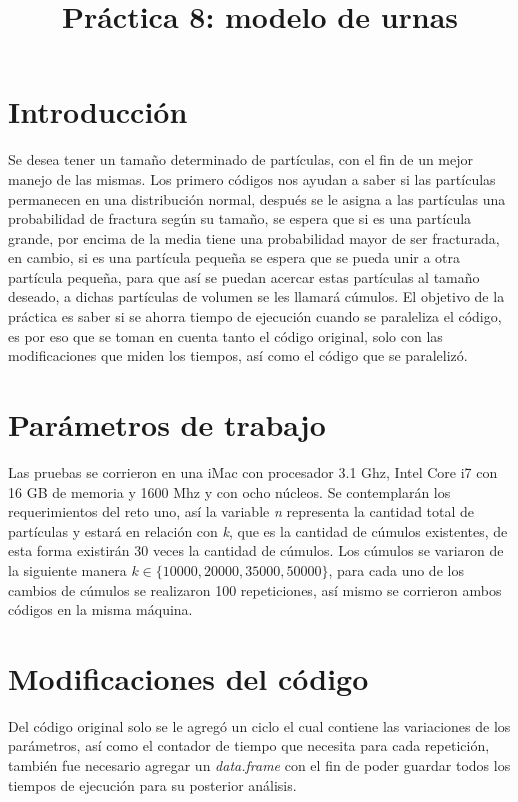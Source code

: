 \documentclass[a4paper]{article}
\title{Práctica 8: modelo de urnas}
\begin{document}
\maketitle

\section{Introducci\'on}
Se desea tener un tamaño determinado de partículas, con el fin de un mejor manejo de las mismas. Los primero códigos nos ayudan a saber si las partículas permanecen en una distribución normal, después se le asigna a las partículas una probabilidad de fractura según su tamaño, se espera que si es una partícula grande, por encima de la media tiene una probabilidad mayor de ser fracturada, en cambio, si es una partícula pequeña se espera que se pueda unir a otra partícula pequeña, para que así se puedan acercar estas partículas al tamaño deseado, a dichas partículas de volumen se les llamará cúmulos. El objetivo de la práctica es saber si se ahorra tiempo de ejecución cuando se paraleliza el código, es por eso que se toman en cuenta tanto el código original, solo con las modificaciones que miden los tiempos, así como el código que se paralelizó.

\section{Par\'ametros de trabajo}
Las pruebas se corrieron en una iMac con procesador 3.1 Ghz, Intel Core i7 con 16 GB de memoria y 1600 Mhz y con ocho núcleos. Se contemplarán los requerimientos del reto uno, así la variable \textit{n} representa la cantidad total de partículas y estará en relación con \textit{k}, que es la cantidad de cúmulos existentes, de esta forma existirán $30$ veces la cantidad de cúmulos. Los cúmulos se variaron de la siguiente manera $k\in\{10000,20000,35000,50000\}$, para cada uno de los cambios de cúmulos se realizaron 100 repeticiones, así mismo se corrieron ambos códigos en la misma máquina.

\section{Modificaciones del código}
Del código original solo se le agregó un ciclo el cual contiene las variaciones de los parámetros, así como el contador de tiempo que necesita para cada repetición, también fue necesario agregar un \textit{data.frame} con el fin de poder guardar todos los tiempos de ejecución para su posterior análisis.
\end{document}
